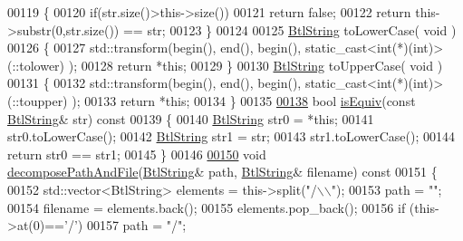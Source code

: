\begin{DoxyCode}
00119 \textcolor{keyword}{    }\{
00120         \textcolor{keywordflow}{if}(str.size()>this->size())
00121             \textcolor{keywordflow}{return} \textcolor{keyword}{false};
00122         \textcolor{keywordflow}{return} this->substr(0,str.size()) == str;
00123     \}
00124 
00125     \hyperlink{class_btl_string}{BtlString} toLowerCase( \textcolor{keywordtype}{void} )
00126     \{
00127         std::transform(begin(), end(), begin(), \textcolor{keyword}{static\_cast<}\textcolor{keywordtype}{int}(*)(\textcolor{keywordtype}{int})\textcolor{keyword}{>}(::tolower) );
00128         \textcolor{keywordflow}{return} *\textcolor{keyword}{this};
00129     \}
00130     \hyperlink{class_btl_string}{BtlString} toUpperCase( \textcolor{keywordtype}{void} )
00131     \{
00132         std::transform(begin(), end(), begin(), \textcolor{keyword}{static\_cast<}\textcolor{keywordtype}{int}(*)(\textcolor{keywordtype}{int})\textcolor{keyword}{>}(::toupper) );
00133         \textcolor{keywordflow}{return} *\textcolor{keyword}{this};
00134     \}
00135 
\hyperlink{class_btl_string_afdc2da5f185fa7585b1363b2dd6b36cb}{00138}     \textcolor{keywordtype}{bool} \hyperlink{class_btl_string_afdc2da5f185fa7585b1363b2dd6b36cb}{isEquiv}(\textcolor{keyword}{const} \hyperlink{class_btl_string}{BtlString}& str)\textcolor{keyword}{ const}
00139 \textcolor{keyword}{    }\{
00140         \hyperlink{class_btl_string}{BtlString} str0 = *\textcolor{keyword}{this};
00141         str0.toLowerCase();
00142         \hyperlink{class_btl_string}{BtlString} str1 = str;
00143         str1.toLowerCase();
00144         \textcolor{keywordflow}{return} str0 == str1;
00145     \}
00146 
\hyperlink{class_btl_string_a111377f6625fffeed8f02992fd164730}{00150}     \textcolor{keywordtype}{void} \hyperlink{class_btl_string_a111377f6625fffeed8f02992fd164730}{decomposePathAndFile}(\hyperlink{class_btl_string}{BtlString}& path, 
      \hyperlink{class_btl_string}{BtlString}& filename)\textcolor{keyword}{ const}
00151 \textcolor{keyword}{    }\{
00152         std::vector<BtlString> elements = this->split(\textcolor{stringliteral}{"/\(\backslash\)\(\backslash\)"});
00153         path = \textcolor{stringliteral}{""};
00154         filename = elements.back();
00155         elements.pop\_back();
00156         \textcolor{keywordflow}{if} (this->at(0)==\textcolor{charliteral}{'/'})
00157             path = \textcolor{stringliteral}{"/"};

\end{DoxyCode}
